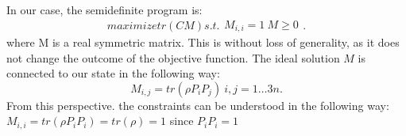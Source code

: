 
In our case, the semidefinite program is:
\[
maximize tr\left( CM \right)
s.t. \begin{align}
	\label{eq:}
M_{i,i} = 1 \
M \ge 0
\end{align}
.\]
where M is a real symmetric matrix.
This is without loss of generality, as it does not change the outcome of the objective function. 
The ideal solution $M$ is connected to our state in the following way:\cite{gharibian19}
\[
	M_{i,j} = tr\left( \rho P_{i}P_j \right) ~ i,j=1\ldots 3n
.\]
From this perspective. the constraints can be understood in the following way:\
$M_{i,i}=tr\left( \rho P_i P_i\right) = tr\left( \rho\right) = 1  $ since $P_iP_i=1$\
